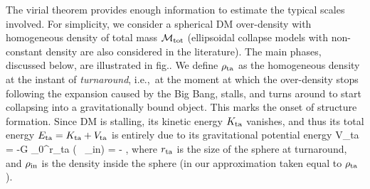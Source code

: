 \medskip




The virial theorem provides enough information to estimate the typical scales involved.
For simplicity, we consider a spherical DM over-density with homogeneous density of total mass ${\mathcal{M}} _{\rm tot}$
(ellipsoidal collapse models with non-constant density are also considered in the literature).
The main phases, discussed below, are illustrated in fig..
We define $\rho_{\rm ta}$ as the homogeneous density  at the instant of {\em turnaround}, 
i.e.,~at the moment at which the over-density 
stops following the expansion caused by the Big Bang, stalls, and turns around to start collapsing into a gravitationally bound object. This marks
 the onset of  structure formation. 
Since DM is stalling, its kinetic energy $K_{\rm ta}$ vanishes, and thus its total energy $E_{\rm ta} = K_{\rm ta}+ V_{\rm ta} $ is entirely due to its gravitational
potential energy 
\beq V_{\rm ta} = -G \int_0^{r_{\rm ta}} \left( \,  \rho_{\rm in}\right)  
= - ,\eeq 
where $r_{\rm ta}$ is the size of the sphere at turnaround, and 
$\rho_{\rm in}$ is the density inside the sphere (in our approximation taken equal to $\rho_{\rm ta}$).


